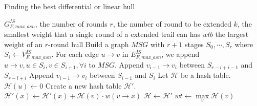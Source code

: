 \begin{algorithm}
	\caption{Finding the best differential or linear hull}
	\label{algo:3}
	\begin{algorithmic}[1]
		\Require $G^{IS}_{F,max\_asn}$, the number of rounds $r$, the number of round to be extended $k$, the smallest weight that a single round of a extended trail can has $wlb$
		\Ensure the largest weight of an $r$-round hull
		\Procedure {}{}
		\State Build a graph $MSG$ with $r+1$ stages $S_0,\cdots,S_r$ where $S_i\leftarrow V^{IS}_{F,max\_asn}$. For each edge $u\rightarrow v$ in $E^{IS}_{F,max\_asn}$, we append $u\rightarrow v, u\in S_i,v\in S_{i+1}, \forall i$ to $MSG$. 
		\State Append $v_{i-1}\rightarrow v_i$ between $S_{r-l+i-1}$ and $S_{r-l+i}$
		\EndFor
		\State Append $v_{i-1}\rightarrow v_i$ between $S_{i-1}$ and $S_{i}$
		\EndFor
		\EndIf
		\EndFor
		\State Let $\mathcal{H}$ be a hash table. 
		\State $\mathcal{H}(u)\leftarrow 0$
		\State Create a new hash table $\mathcal{H}'$. 
		\State $\mathcal{H}'(x)\leftarrow \mathcal{H}'(x)+\mathcal{H}(v)\cdot w(v\rightarrow x)$
		\EndFor
		\EndFor
		\State $\mathcal{H}\leftarrow \mathcal{H}'$
		\EndFor
		\State $wt\leftarrow \max\limits_{v}\mathcal{H}(v)$
		\EndIf
		\EndFor
		\State {}
		\EndProcedure
	\end{algorithmic}
\end{algorithm}



